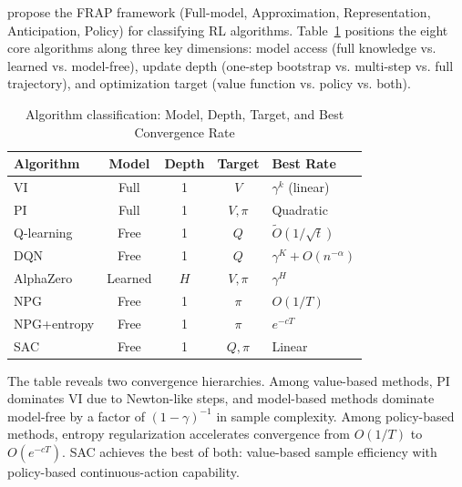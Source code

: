 \citet{moerland2022unifying} propose the FRAP framework (Full-model, Approximation, Representation, Anticipation, Policy) for classifying RL algorithms. Table~\ref{tab:frap} positions the eight core algorithms along three key dimensions: model access (full knowledge vs. learned vs. model-free), update depth (one-step bootstrap vs. multi-step vs. full trajectory), and optimization target (value function vs. policy vs. both).

\begin{table}[h!]
\centering
\caption{Algorithm classification: Model, Depth, Target, and Best Convergence Rate}
\label{tab:frap}
\begin{tabular}{l|ccc|l}
\hline
Algorithm & Model & Depth & Target & Best Rate \\
\hline
VI & Full & 1 & $V$ & $\gamma^k$ (linear) \\
PI & Full & 1 & $V, \pi$ & Quadratic \\
Q-learning & Free & 1 & $Q$ & $\tilde{O}(1/\sqrt{t})$ \\
DQN & Free & 1 & $Q$ & $\gamma^K + O(n^{-\alpha})$ \\
AlphaZero & Learned & $H$ & $V, \pi$ & $\gamma^H$ \\
NPG & Free & 1 & $\pi$ & $O(1/T)$ \\
NPG+entropy & Free & 1 & $\pi$ & $e^{-cT}$ \\
SAC & Free & 1 & $Q, \pi$ & Linear \\
\hline
\end{tabular}
\end{table}

The table reveals two convergence hierarchies. Among value-based methods, PI dominates VI due to Newton-like steps, and model-based methods dominate model-free by a factor of $(1-\gamma)^{-1}$ in sample complexity. Among policy-based methods, entropy regularization accelerates convergence from $O(1/T)$ to $O(e^{-cT})$. SAC achieves the best of both: value-based sample efficiency with policy-based continuous-action capability.
